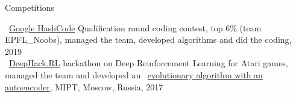 \documentclass{resume} %
\newcommand*{\mybold}[1]{{\color{gray} #1}}
\newcommand{\mylink}{{\color{gray}\faExternalLink}}
\begin{document}
\begin{rSection}{Competitions}
\vspace{-1em}
\item  \mylink~\href{https://web.archive.org/web/20190329104357/https://hashcodejudge.withgoogle.com/scoreboard}{Google HashCode} Qualification round coding contest, \mybold{top 6\%} (team EPFL\_Noobs), managed the team, developed algorithms and did the coding, 2019\vspace{1em}\\

\mylink~\href{http://web.archive.org/web/20170224094223/http://rl.deephack.me/}{DeepHack.RL} hackathon on Deep \mybold{Reinforcement} Learning for Atari games, managed the team and developed an \mylink~\href{https://github.com/sergeivolodin/deephack.rl}{evolutionary algorithm with an autoencoder}, MIPT, Moscow, Russia, 2017
\end{rSection}
\end{document}
